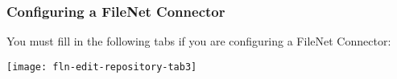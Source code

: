 %
%

\subsubsection{Configuring a FileNet Connector}

You must fill in the following tabs if you are configuring a
FileNet Connector:

\texttt{[image: fln-edit-repository-tab3]}

